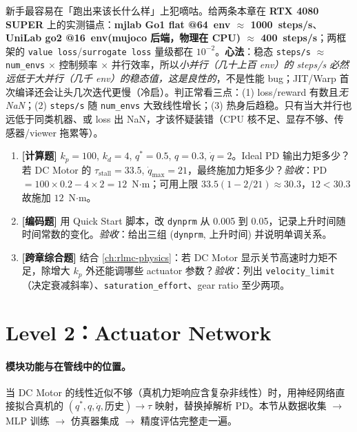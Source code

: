 \begin{insight}\label{ins:rlmc-act-sps-anchor}
新手最容易在「跑出来该长什么样」上犯嘀咕。给两条本章在 \textbf{RTX 4080 SUPER} 上的实测锚点：\textbf{mjlab Go1 flat @64~env $\approx$ 1000~steps/s}、\textbf{UniLab go2 @16~env(mujoco 后端，物理在 CPU) $\approx$ 400~steps/s}；两框架的 \verb|value loss|/\verb|surrogate loss| 量级都在 $10^{-2}$。\textbf{心法}：稳态 \verb|steps/s| $\approx$ \verb|num_envs| $\times$ 控制频率 $\times$ 并行效率，所以\emph{小并行（几十上百 env）的 steps/s 必然远低于大并行（几千 env）的稳态值，这是良性的}，不是性能 bug；JIT/Warp 首次编译还会让头几次迭代更慢（冷启）。判正常看三点：(1) loss/reward 有数且\emph{无 NaN}；(2) \verb|steps/s| 随 \verb|num_envs| 大致线性增长；(3) 热身后趋稳。只有当大并行也远低于同类机器、或 loss 出 NaN，才该怀疑装错（CPU 核不足、显存不够、传感器/viewer 拖累等）。
\end{insight}

\begin{practice}[本节练习]
\begin{enumerate}
  \item \textbf{[计算题]} $k_p=100$, $k_d=4$, $q^*=0.5$, $q=0.3$, $\dot q=2$。Ideal PD 输出力矩多少？若 DC Motor 的 $\tau_{\mathrm{stall}}=33.5$, $\dot q_{\max}=21$，最终施加力矩多少？\emph{验收}：PD $=100\times0.2-4\times2=12$~N$\cdot$m；可用上限 $33.5(1-2/21)\approx30.3$，$12<30.3$ 故施加 $12$~N$\cdot$m。
  \item \textbf{[编码题]} 用 Quick Start 脚本，改 \verb|dynprm| 从 0.005 到 0.05，记录上升时间随时间常数的变化。\emph{验收}：给出三组 (\verb|dynprm|, 上升时间) 并说明单调关系。
  \item \textbf{[跨章综合题]} 结合 \cref{ch:rlmc-physics}：若 DC Motor 显示关节高速时力矩不足，除增大 $k_p$ 外还能调哪些 actuator 参数？\emph{验收}：列出 \verb|velocity_limit|（决定衰减斜率）、\verb|saturation_effort|、gear ratio 至少两项。
\end{enumerate}
\end{practice}

\section{Level 2：Actuator Network}
\label{sec:rlmc-act-net}

\paragraph{模块功能与在管线中的位置。}当 DC Motor 的线性近似不够（真机力矩响应含复杂非线性）时，用神经网络直接拟合真机的 $(q^*,q,\dot q,\text{历史})\to\tau$ 映射，替换掉解析 PD。本节从数据收集 $\to$ MLP 训练 $\to$ 仿真器集成 $\to$ 精度评估完整走一遍。

